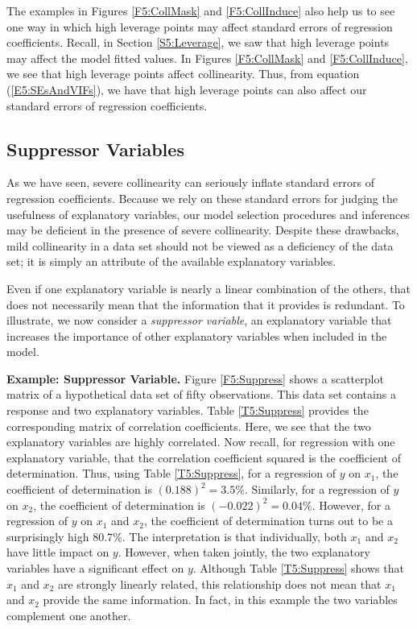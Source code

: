 The examples in Figures \ref{F5:CollMask} and \ref{F5:CollInduce}
also help us to see one way in which high leverage points may affect
standard errors of regression coefficients. Recall, in Section
\ref{S5:Leverage}, we saw that high leverage points may affect the
model fitted values. In Figures \ref{F5:CollMask} and
\ref{F5:CollInduce}, we see that high leverage points affect
collinearity. Thus, from equation (\ref{E5:SEsAndVIFs}), we have
that high leverage points can also affect our standard errors of
regression coefficients.

\subsection{Suppressor Variables}\label{S5:Suppressor}

As we have seen, severe collinearity can seriously inflate standard
errors of regression coefficients. Because we rely on these standard
errors for judging the usefulness of explanatory variables, our
model selection procedures and inferences may be deficient in the
presence of severe collinearity. Despite these drawbacks, mild
collinearity in a data set should not be viewed as a deficiency of
the data set; it is simply an attribute of the available explanatory
variables.

Even if one explanatory variable is nearly a linear combination of
the others, that does not necessarily mean that the information that
it provides is redundant. To illustrate, we now consider a
\textit{suppressor variable}, an explanatory variable that increases
the importance of other explanatory variables when included in the
model.

\linejed

\textbf{Example: Suppressor Variable.} Figure \ref{F5:Suppress}
shows a scatterplot matrix of a hypothetical data set of fifty
observations. This data set contains a response and two explanatory
variables. Table \ref{T5:Suppress} provides the corresponding matrix
of correlation coefficients. Here, we see that the two explanatory
variables are highly correlated. Now recall, for regression with one
explanatory variable, that the correlation coefficient squared is
the coefficient of determination. Thus, using Table
\ref{T5:Suppress}, for a regression of $y$ on $x_1$, the coefficient
of determination is $(0.188)^2=3.5\%$. Similarly, for a regression
of $y$ on $x_2$, the coefficient of
determination is $(-0.022)^2=0.04\%$. However, for a regression of $y$ on $%
x_1$ and $x_2$, the coefficient of determination turns out to be a
surprisingly high $80.7\%$. The interpretation is that individually, both $%
x_1$ and $x_2$ have little impact on $y$. However, when taken
jointly, the two explanatory variables have a significant effect on
$y$. Although Table \ref{T5:Suppress} shows that $x_1$ and $x_2$ are
strongly linearly related, this relationship does not mean that
$x_1$ and $x_2$ provide the same information. In fact, in this
example the two variables complement one another.

